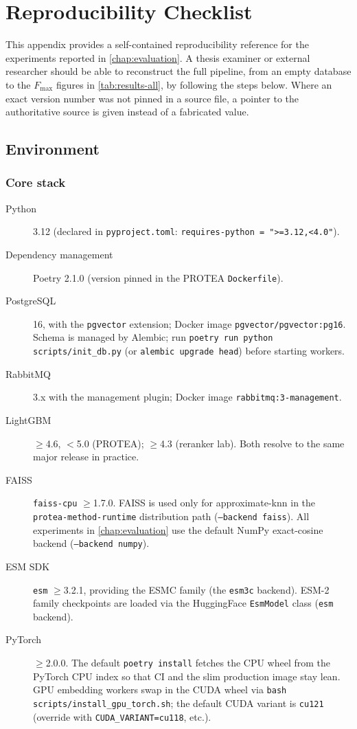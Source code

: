 \chapter{Reproducibility Checklist}
\label{app:repro}

This appendix provides a self-contained reproducibility reference for
the experiments reported in \cref{chap:evaluation}. A thesis examiner
or external researcher should be able to reconstruct the full pipeline,
from an empty database to the $F_{\max}$ figures in \cref{tab:results-all},
by following the steps below. Where an exact version number was not pinned
in a source file, a pointer to the authoritative source is given instead
of a fabricated value.

\section{Environment}
\label{app:repro-env}

\subsection{Core stack}
\label{app:repro-core}

\begin{description}
  \item[Python] 3.12 (declared in \texttt{pyproject.toml}:
    \texttt{requires-python = ">=3.12,<4.0"}).
  \item[Dependency management] Poetry 2.1.0 (version pinned in the
    PROTEA \texttt{Dockerfile}).
  \item[PostgreSQL] 16, with the \texttt{pgvector} extension; Docker image
    \texttt{pgvector/pgvector:pg16}. Schema is managed by Alembic; run
    \texttt{poetry run python scripts/init\_db.py} (or \texttt{alembic upgrade head})
    before starting workers.
  \item[RabbitMQ] 3.x with the management plugin; Docker image
    \texttt{rabbitmq:3-management}.
  \item[LightGBM] $\geq$4.6, $<$5.0 (PROTEA); $\geq$4.3 (reranker lab).
    Both resolve to the same major release in practice.
  \item[FAISS] \texttt{faiss-cpu} $\geq$1.7.0. FAISS is used only
    for approximate-\gls{knn} in the \texttt{protea-method-runtime}
    distribution path (\texttt{--backend faiss}). All experiments in
    \cref{chap:evaluation} use the default NumPy exact-cosine backend
    (\texttt{--backend numpy}).
  \item[ESM SDK] \texttt{esm} $\geq$3.2.1, providing the ESMC family
    (the \texttt{esm3c} backend). ESM-2 family checkpoints are loaded
    via the HuggingFace \texttt{EsmModel} class (\texttt{esm} backend).
  \item[PyTorch] $\geq$2.0.0. The default \texttt{poetry install} fetches
    the CPU wheel from the PyTorch CPU index so that CI and the slim
    production image stay lean. GPU embedding workers swap in the CUDA
    wheel via \texttt{bash scripts/install\_gpu\_torch.sh}; the default
    CUDA variant is \texttt{cu121} (override with
    \texttt{CUDA\_VARIANT=cu118}, etc.).
\end{description}

